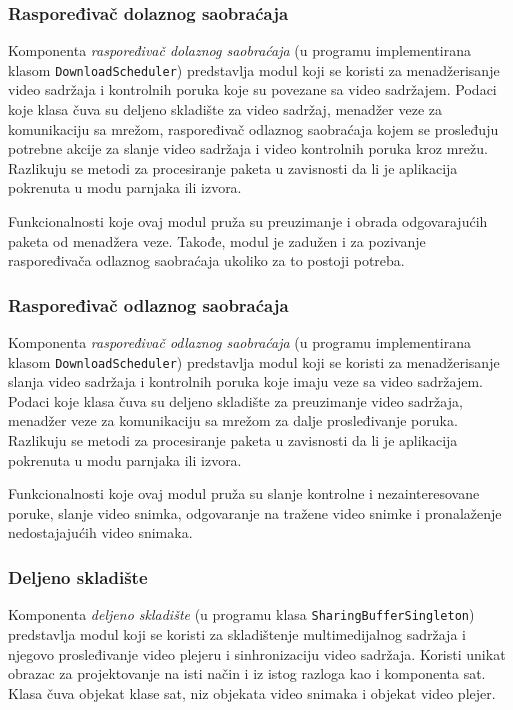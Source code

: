 \documentclass[12pt,oneside]{memoir}
\begin{document}
\subsubsection{Raspoređivač dolaznog saobraćaja}
\label{implementacija.2.3.5}

Komponenta \textit{raspoređivač dolaznog saobraćaja} (u programu implementirana klasom \texttt{DownloadScheduler}) predstavlja modul koji se koristi za menadžerisanje video sadržaja i kontrolnih poruka koje su povezane sa video sadržajem. Podaci koje klasa čuva su deljeno skladište za video sadržaj, menadžer veze za komunikaciju sa mrežom, raspoređivač odlaznog saobraćaja kojem se prosleđuju potrebne akcije za slanje video sadržaja i video kontrolnih poruka kroz mrežu. Razlikuju se metodi za procesiranje paketa u zavisnosti da li je aplikacija pokrenuta u modu parnjaka ili izvora.

Funkcionalnosti koje ovaj modul pruža su preuzimanje i obrada odgovarajućih paketa od menadžera veze. Takođe, modul je zadužen i za pozivanje raspoređivača odlaznog saobraćaja ukoliko za to postoji potreba.


\subsubsection{Raspoređivač odlaznog saobraćaja}
\label{implementacija.2.3.6}

Komponenta \textit{raspoređivač odlaznog saobraćaja} (u programu implementirana klasom \texttt{DownloadScheduler}) predstavlja modul koji se koristi za menadžerisanje slanja video sadržaja i kontrolnih poruka koje imaju veze sa video sadržajem. Podaci koje klasa čuva su deljeno skladište za preuzimanje video sadržaja, menadžer veze za komunikaciju sa mrežom za dalje prosleđivanje poruka. Razlikuju se metodi za procesiranje paketa u zavisnosti da li je aplikacija pokrenuta u modu parnjaka ili izvora.

Funkcionalnosti koje ovaj modul pruža su slanje kontrolne i nezainteresovane poruke, slanje video snimka, odgovaranje na tražene video snimke i pronalaženje nedostajajućih video snimaka.

\subsubsection{Deljeno skladište}
\label{implementacija.2.3.7}

Komponenta \textit{deljeno skladište} (u programu klasa \texttt{SharingBufferSingleton}) predstavlja modul koji se koristi za skladištenje multimedijalnog sadržaja i njegovo prosleđivanje video plejeru i sinhronizaciju video sadržaja. Koristi unikat obrazac za projektovanje na isti način i iz istog razloga kao i komponenta sat. Klasa čuva objekat klase sat, niz objekata video snimaka i objekat video plejer. 
\end{document}
